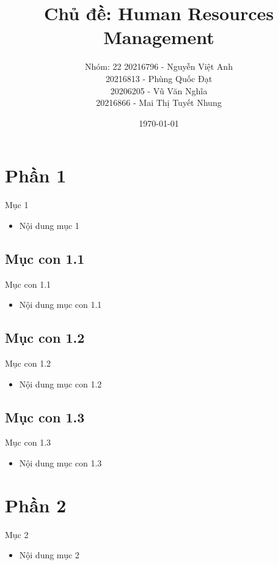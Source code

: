 \documentclass{beamer}
\title[{\makebox[.15\paperwidth]{HRM}}]{Chủ đề: Human Resources Management}
\author[Nhóm: 22]{Nhóm: 22
20216796 - Nguyễn Việt Anh \\
20216813 - Phùng Quốc Đạt \\
20206205 - Vũ Văn Nghĩa \\
20216866 - Mai Thị Tuyết Nhung
}
\date{\today}
\begin{document}

\frame{\titlepage}

\frame{\tableofcontents}

\section{Phần 1}
\begin{frame}{Mục 1}
\begin{itemize}
\item Nội dung mục 1
\end{itemize}
\end{frame}

\subsection{Mục con 1.1}
\begin{frame}{Mục con 1.1}
\begin{itemize}
\item Nội dung mục con 1.1
\end{itemize}
\end{frame}

\subsection{Mục con 1.2}
\begin{frame}{Mục con 1.2}
\begin{itemize}
\item Nội dung mục con 1.2
\end{itemize}
\end{frame}

\subsection{Mục con 1.3}
\begin{frame}{Mục con 1.3}
\begin{itemize}
\item Nội dung mục con 1.3
\end{itemize}
\end{frame}

\section{Phần 2}
\begin{frame}{Mục 2}
\begin{itemize}
\item Nội dung mục 2
\end{itemize}
\end{frame}
\end{document}
